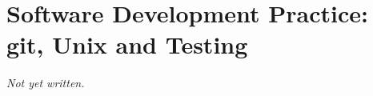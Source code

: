\chapter{Software Development Practice: git, Unix and Testing}\label{ch:software-development}


\textit{Not yet written.}
